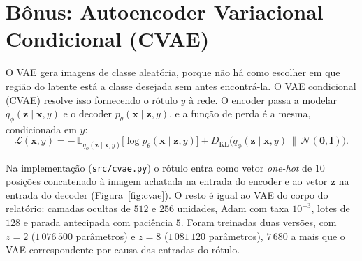 \documentclass[11pt,a4paper]{article}
\begin{document}
\clearpage
\appendix
\renewcommand{\thesection}{\Alph{section}}
\section{Bônus: Autoencoder Variacional Condicional (CVAE)}

O VAE gera imagens de classe aleatória, porque não há como escolher em que região do latente está a classe desejada sem antes encontrá-la. O VAE condicional (CVAE) resolve isso fornecendo o rótulo $y$ à rede. O encoder passa a modelar $q_\phi(\mathbf{z} \mid \mathbf{x}, y)$ e o decoder $p_\theta(\mathbf{x} \mid \mathbf{z}, y)$, e a função de perda é a mesma, condicionada em $y$:
\begin{equation}
    \mathcal{L}(\mathbf{x}, y) = -\,\mathbb{E}_{q_\phi(\mathbf{z}\mid\mathbf{x},y)}\big[\log p_\theta(\mathbf{x} \mid \mathbf{z}, y)\big] + D_{\mathrm{KL}}\big(q_\phi(\mathbf{z} \mid \mathbf{x}, y) \,\|\, \mathcal{N}(\mathbf{0}, \mathbf{I})\big).
\end{equation}

Na implementação (\texttt{src/cvae.py}) o rótulo entra como vetor \textit{one-hot} de $10$ posições concatenado à imagem achatada na entrada do encoder e ao vetor $\mathbf{z}$ na entrada do decoder (Figura~\ref{fig:cvae}). O resto é igual ao VAE do corpo do relatório: camadas ocultas de $512$ e $256$ unidades, Adam com taxa $10^{-3}$, lotes de $128$ e parada antecipada com paciência $5$. Foram treinadas duas versões, com $z = 2$ ($1\,076\,500$ parâmetros) e $z = 8$ ($1\,081\,120$ parâmetros), $7\,680$ a mais que o VAE correspondente por causa das entradas do rótulo.
\end{document}
